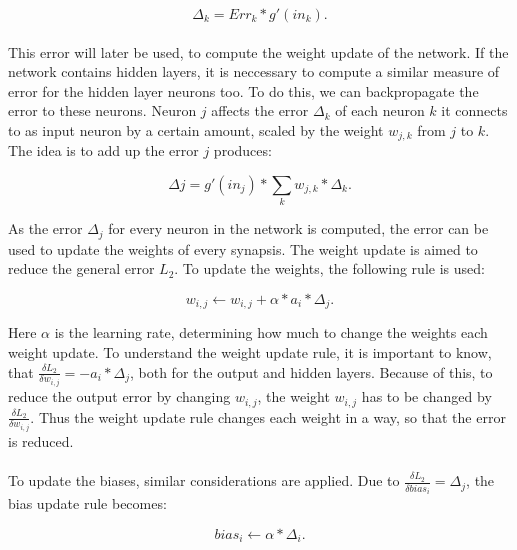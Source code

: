 \begin{equation}
\label{eq:bp:errout}
\Delta_k = Err_k * g'(in_k).
\end{equation}
\\
This error will later be used, to compute the weight update of the network. If the network contains hidden layers, it is neccessary to compute a similar measure of error for the hidden layer neurons too. To do this, we can backpropagate the error to these neurons. Neuron $j$ affects the error $\Delta_k$ of each neuron $k$ it connects to as input neuron by a certain amount, scaled by the weight $w_{j,k}$ from $j$ to $k$. The idea is to add up the error $j$ produces: 

\begin{equation}
\label{eq:bp:errhid}
\Delta j = g'(in_j) * \sum\limits_k w_{j,k} * \Delta_k.
\end{equation}

As the error $\Delta_j$ for every neuron in the network is computed, the error can be used to update the weights of every synapsis. The weight update is aimed to reduce the general error $L_2$. To update the weights, the following rule is used:

\begin{equation}
\label{eq:bp:wupd}
w_{i,j} \leftarrow w_{i,j} + \alpha * a_i * \Delta_j.
\end{equation}

Here $\alpha$ is the learning rate, determining how much to change the weights each weight update. To understand the weight update rule, it is important to know, that $\frac{ \delta L_2 }{ \delta w_{i,j} } = -a_i * \Delta_j$, both for the output and hidden layers. Because of this, to reduce the output error by changing $w_{i,j}$, the weight $w_{i,j}$ has to be changed by $\frac{ \delta L_2 }{ \delta w_{i,j} }$. Thus the weight update rule changes each weight in a way, so that the error is reduced. 
\\
\\
To update the biases, similar considerations are applied. Due to $\frac{ \delta L_2 }{ \delta bias_i } = \Delta_j$, the bias update rule becomes: 

\begin{equation}
\label{eq:bp:bupd}
bias_i \leftarrow \alpha * \Delta_i.
\end{equation}

